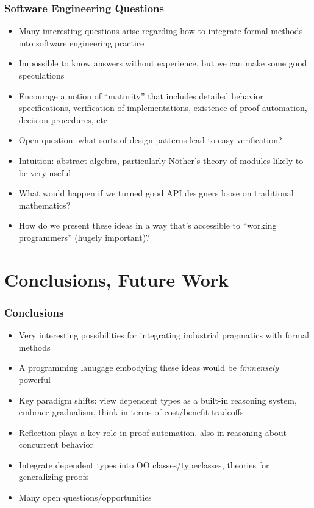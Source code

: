 \documentclass{beamer}
\begin{document}
\begin{frame}
  \frametitle{Software Engineering Questions}
  \begin{itemize}
    \item Many interesting questions arise regarding how to integrate
      formal methods into software engineering practice
    \item Impossible to know answers without experience, but we can
      make some good speculations
    \item Encourage a notion of ``maturity'' that includes detailed
      behavior specifications, verification of implementations,
      existence of proof automation, decision procedures, etc
    \item Open question: what sorts of design patterns lead to easy
      verification?
    \item Intuition: abstract algebra, particularly N\"{o}ther's
      theory of modules likely to be very useful
    \item What would happen if we turned good API designers loose on
      traditional mathematics?
    \item How do we present these ideas in a way that's accessible to
     ``working programmers'' (hugely important)?
  \end{itemize}
\end{frame}

\section{Conclusions, Future Work}

\begin{frame}
  \frametitle{Conclusions}
  \begin{itemize}
    \item Very interesting possibilities for integrating industrial
      pragmatics with formal methods
    \item A programming lanugage embodying these ideas would be
      \emph{immensely} powerful
    \item Key paradigm shifts: view dependent types as a built-in
      reasoning system, embrace gradualism, think in terms of
      cost/benefit tradeoffs
    \item Reflection plays a key role in proof automation, also
      in reasoning about concurrent behavior
    \item Integrate dependent types into OO classes/typeclasses,
      theories for generalizing proofs
    \item Many open questions/opportunities
  \end{itemize}
\end{frame}
\end{document}
